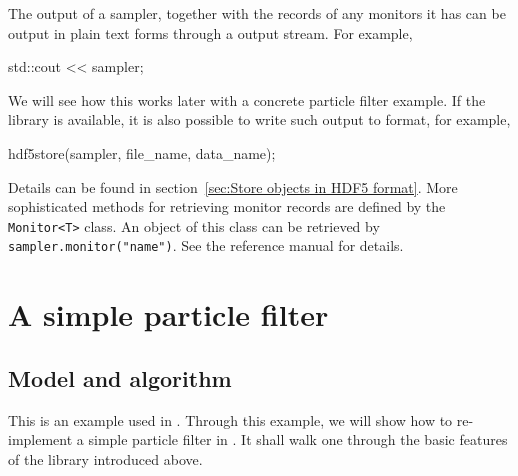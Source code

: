 The output of a sampler, together with the records of any monitors it has can
be output in plain text forms through a \cpp output stream. For example,
\begin{cppcode}
  std::cout << sampler;
\end{cppcode}
We will see how this works later with a concrete particle filter example. If
the \hdf library is available, it is also possible to write such output to \hdf
format, for example,
\begin{cppcode}
  hdf5store(sampler, file_name, data_name);
\end{cppcode}
Details can be found in section~\ref{sec:Store objects in HDF5 format}. More
sophisticated methods for retrieving monitor records are defined by the
\verb|Monitor<T>| class. An object of this class can be retrieved by
\verb|sampler.monitor("name")|. See the reference manual for details.

\section{A simple particle filter}
\label{sec:A simple particle filter}

\subsection{Model and algorithm}
\label{sub:Model and algorithm}

This is an example used in \textcite{Johansen:2009wd}. Through this example, we
will show how to re-implement a simple particle filter in \vsmc. It shall walk
one through the basic features of the library introduced above.

